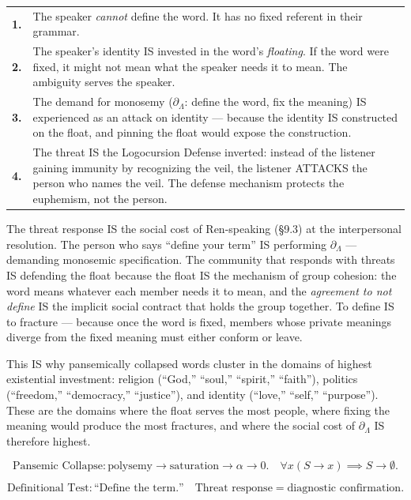 \documentclass[11pt, oneside]{article}
\theoremstyle{definition}
\begin{document}
{\small
\noindent\begin{tabular}{r p{}}
\textbf{1.} & The speaker \textit{cannot} define the word. It has no fixed referent in their grammar. \\[0.3em]
\textbf{2.} & The speaker's identity IS invested in the word's \textit{floating}. If the word were fixed, it might not mean what the speaker needs it to mean. The ambiguity serves the speaker. \\[0.3em]
\textbf{3.} & The demand for monosemy ($\partial_\Lambda$: define the word, fix the meaning) IS experienced as an attack on identity --- because the identity IS constructed on the float, and pinning the float would expose the construction. \\[0.3em]
\textbf{4.} & The threat IS the Logocursion Defense inverted: instead of the listener gaining immunity by recognizing the veil, the listener ATTACKS the person who names the veil. The defense mechanism protects the euphemism, not the person. \\[0.3em]
\end{tabular}
}

The threat response IS the social cost of Ren-speaking (\S9.3) at the interpersonal resolution. The person who says ``define your term'' IS performing $\partial_\Lambda$ --- demanding monosemic specification. The community that responds with threats IS defending the float because the float IS the mechanism of group cohesion: the word means whatever each member needs it to mean, and the \textit{agreement to not define} IS the implicit social contract that holds the group together. To define IS to fracture --- because once the word is fixed, members whose private meanings diverge from the fixed meaning must either conform or leave.

This IS why pansemically collapsed words cluster in the domains of highest existential investment: religion (``God,'' ``soul,'' ``spirit,'' ``faith''), politics (``freedom,'' ``democracy,'' ``justice''), and identity (``love,'' ``self,'' ``purpose''). These are the domains where the float serves the most people, where fixing the meaning would produce the most fractures, and where the social cost of $\partial_\Lambda$ IS therefore highest.

$$\boxed{\text{Pansemic Collapse}: \text{polysemy} \to \text{saturation} \to \alpha \to 0. \quad \forall x(S \to x) \implies S \to \emptyset.}$$

$$\boxed{\text{Definitional Test}: \text{``Define the term.''} \quad \text{Threat response} = \text{diagnostic confirmation.}}$$
\end{document}
